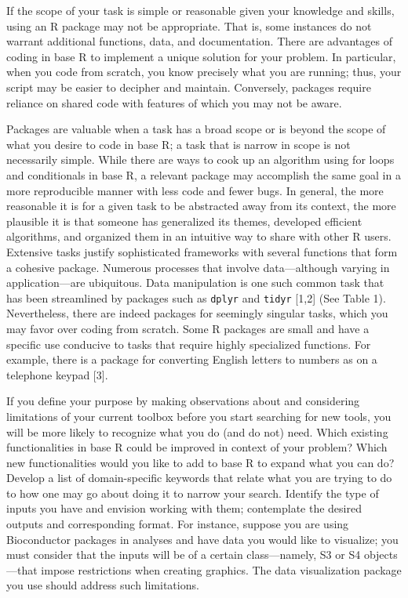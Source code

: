 \documentclass[10pt,letterpaper]{article}
\begin{document}
If the scope of your task is simple or reasonable given your knowledge
and skills, using an R package may not be appropriate. That is, some
instances do not warrant additional functions, data, and documentation.
There are advantages of coding in base R to implement a unique solution
for your problem. In particular, when you code from scratch, you know
precisely what you are running; thus, your script may be easier to
decipher and maintain. Conversely, packages require reliance on shared
code with features of which you may not be aware.

Packages are valuable when a task has a broad scope or is beyond the
scope of what you desire to code in base R; a task that is narrow in
scope is not necessarily simple. While there are ways to cook up an
algorithm using for loops and conditionals in base R, a relevant package
may accomplish the same goal in a more reproducible manner with less
code and fewer bugs. In general, the more reasonable it is for a given
task to be abstracted away from its context, the more plausible it is
that someone has generalized its themes, developed efficient algorithms,
and organized them in an intuitive way to share with other R users.
Extensive tasks justify sophisticated frameworks with several functions
that form a cohesive package. Numerous processes that involve
data---although varying in application---are ubiquitous. Data
manipulation is one such common task that has been streamlined by
packages such as \texttt{dplyr} and \texttt{tidyr} {[}1,2{]} (See Table
1). Nevertheless, there are indeed packages for seemingly singular
tasks, which you may favor over coding from scratch. Some R packages are
small and have a specific use conducive to tasks that require highly
specialized functions. For example, there is a package for converting
English letters to numbers as on a telephone keypad {[}3{]}.

If you define your purpose by making observations about and considering
limitations of your current toolbox before you start searching for new
tools, you will be more likely to recognize what you do (and do not)
need. Which existing functionalities in base R could be improved in
context of your problem? Which new functionalities would you like to add
to base R to expand what you can do? Develop a list of domain-specific
keywords that relate what you are trying to do to how one may go about
doing it to narrow your search. Identify the type of inputs you have and
envision working with them; contemplate the desired outputs and
corresponding format. For instance, suppose you are using Bioconductor
packages in analyses and have data you would like to visualize; you must
consider that the inputs will be of a certain class---namely, S3 or S4
objects---that impose restrictions when creating graphics. The data
visualization package you use should address such limitations.
\end{document}
